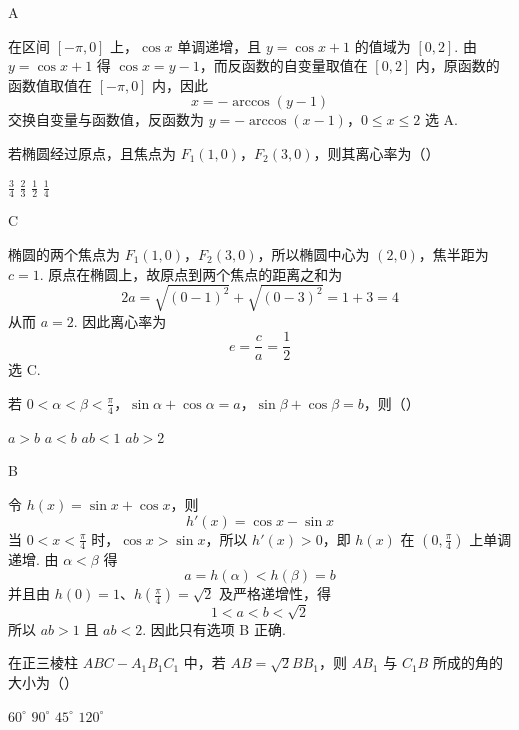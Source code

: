 \begin{answer}
A
\end{answer}

\begin{solution}
在区间 \([-\pi,0]\) 上，\(\cos x\) 单调递增，且 \(y=\cos x+1\) 的值域为 \([0,2]\). 由 \(y=\cos x+1\) 得 \(\cos x=y-1\)，而反函数的自变量取值在 \([0,2]\) 内，原函数的函数值取值在 \([-\pi,0]\) 内，因此
\[
x=-\arccos(y-1)
\]
交换自变量与函数值，反函数为
\(y=-\arccos(x-1)\)，\(0\leqslant x\leqslant2\)
选 A.
\end{solution}

\begin{problem}
若椭圆经过原点，且焦点为 \(F_{1}(1,0)\)，\(F_{2}(3,0)\)，则其离心率为（\quad）

\choices
    {\( \frac{3}{4} \)}
    {\( \frac{2}{3} \)}
    {\( \frac{1}{2} \)}
    {\( \frac{1}{4} \)}
\end{problem}

\begin{answer}
C
\end{answer}

\begin{solution}
椭圆的两个焦点为 \(F_1(1,0)\)，\(F_2(3,0)\)，所以椭圆中心为 \((2,0)\)，焦半距为 \(c=1\). 原点在椭圆上，故原点到两个焦点的距离之和为
\[
2a=\sqrt{(0-1)^2}+\sqrt{(0-3)^2}=1+3=4
\]
从而 \(a=2\). 因此离心率为
\[
e=\frac ca=\frac12
\]
选 C.
\end{solution}

\begin{problem}
若 \(0 < \alpha < \beta < \frac{\pi}{4}\)，\(\sin \alpha + \cos \alpha = a\)，\(\sin \beta + \cos \beta = b\)，则（\quad）

\choices
    {\(a > b\)}
    {\(a < b\)}
    {\(ab < 1\)}
    {\(ab > 2\)}
\end{problem}

\begin{answer}
B
\end{answer}

\begin{solution}
令 \(h(x)=\sin x+\cos x\)，则
\[
h'(x)=\cos x-\sin x
\]
当 \(0<x<\frac\pi4\) 时，\(\cos x>\sin x\)，所以 \(h'(x)>0\)，即 \(h(x)\) 在 \(\left(0,\frac\pi4\right)\) 上单调递增. 由 \(\alpha<\beta\) 得
\[
a=h(\alpha)<h(\beta)=b
\]
并且由 \(h(0)=1\)、\(h\left(\frac\pi4\right)=\sqrt2\) 及严格递增性，得
\[
1<a<b<\sqrt2
\]
所以 \(ab>1\) 且 \(ab<2\). 因此只有选项 B 正确.
\end{solution}

\begin{problem}
在正三棱柱 \(ABC - A_{1}B_{1}C_{1}\) 中，若 \(AB = \sqrt{2} BB_{1}\)，则 \(AB_{1}\) 与 \(C_{1}B\) 所成的角的大小为（\quad）

\choices
    {\(60^{\circ}\)}
    {\(90^{\circ}\)}
    {\(45^{\circ}\)}
    {\(120^{\circ}\)}
\end{problem}

